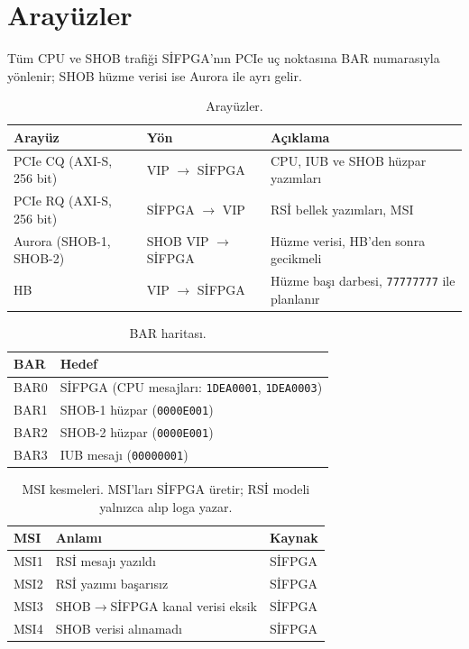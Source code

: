 \documentclass[11pt,a4paper]{article}
\newcommand{\kod}[1]{\texttt{#1}}
\begin{document}
\section{Arayüzler}

Tüm CPU ve SHOB trafiği SİFPGA'nın PCIe uç noktasına BAR numarasıyla yönlenir;
SHOB hüzme verisi ise Aurora ile ayrı gelir.

\begin{table}[h]
\centering
\begin{tabular}{@{}lll@{}}
\toprule
Arayüz & Yön & Açıklama \\
\midrule
PCIe CQ (AXI-S, 256 bit) & VIP $\to$ SİFPGA & CPU, IUB ve SHOB hüzpar yazımları \\
PCIe RQ (AXI-S, 256 bit) & SİFPGA $\to$ VIP & RSİ bellek yazımları, MSI \\
Aurora (SHOB-1, SHOB-2) & SHOB VIP $\to$ SİFPGA & Hüzme verisi, HB'den sonra gecikmeli \\
HB & VIP $\to$ SİFPGA & Hüzme başı darbesi, \kod{77777777} ile planlanır \\
\bottomrule
\end{tabular}
\caption{Arayüzler.}
\end{table}

\begin{table}[h]
\centering
\begin{tabular}{@{}ll@{}}
\toprule
BAR & Hedef \\
\midrule
BAR0 & SİFPGA (CPU mesajları: \kod{1DEA0001}, \kod{1DEA0003}) \\
BAR1 & SHOB-1 hüzpar (\kod{0000E001}) \\
BAR2 & SHOB-2 hüzpar (\kod{0000E001}) \\
BAR3 & IUB mesajı (\kod{00000001}) \\
\bottomrule
\end{tabular}
\caption{BAR haritası.}
\end{table}

\begin{table}[h]
\centering
\begin{tabular}{@{}lll@{}}
\toprule
MSI & Anlamı & Kaynak \\
\midrule
MSI1 & RSİ mesajı yazıldı & SİFPGA \\
MSI2 & RSİ yazımı başarısız & SİFPGA \\
MSI3 & SHOB$\to$SİFPGA kanal verisi eksik & SİFPGA \\
MSI4 & SHOB verisi alınamadı & SİFPGA \\
\bottomrule
\end{tabular}
\caption{MSI kesmeleri. MSI'ları SİFPGA üretir; RSİ modeli yalnızca alıp loga yazar.}
\end{table}
\end{document}
